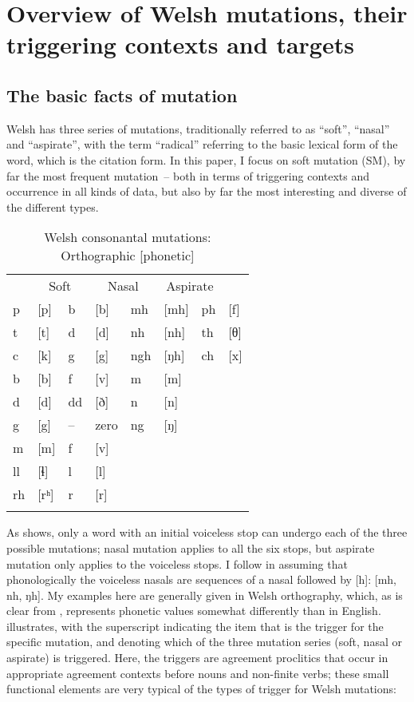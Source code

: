 \documentclass[output=paper,colorlinks,citecolor=brown]{langscibook}
\begin{document}
\section{Overview of Welsh mutations, their triggering contexts and targets}\label{sec:tallerman:2}
\subsection{The basic facts of mutation}

Welsh has three series of mutations, traditionally referred to as “soft”, “nasal” and “aspirate”, with the term “radical” referring to the basic lexical form of the word, which is the citation form. In this paper, I focus on soft mutation (SM), by far the most frequent mutation~– both in terms of triggering contexts and occurrence in all kinds of data, but also by far the most interesting and diverse of the different types. 

\begin{table}
\centering
\caption{Welsh consonantal mutations: Orthographic [phonetic]}
\label{tab:tallerman1}
\begin{tabular}{*8{l}}
\lsptoprule
\multicolumn{2}{c}{{Radical}} & \multicolumn{2}{c}{{Soft}} & \multicolumn{2}{c}{{Nasal}} & \multicolumn{2}{c}{{Aspirate}}\\
\cmidrule(lr){1-2}\cmidrule(lr){3-4}\cmidrule(lr){5-6}\cmidrule(lr){7-8}
p  & [p]  & b  & [b]  & mh  & [mh] & ph & [f]\\
t  & [t]  & d  & [d]  & nh  & [nh] & th & [θ]\\
c  & [k]  & g  & [g]  & ngh & [ŋh] & ch & [x]\\
b  & [b]  & f  & [v]  & m   & [m]  &    & \\
d  & [d]  & dd & [ð]  & n   & [n]  &    & \\
g  & [g]  & –  & zero & ng  & [ŋ]  &    & \\
m  & [m]  & f  & [v]  &     &      &    & \\
ll & [ɬ]  & l  & [l]  &     &      &    & \\
rh & [rʰ] & r  & [r]  &     &      &    & \\
\lspbottomrule
\end{tabular}
\end{table}

As  shows, only a word with an initial voiceless stop can undergo each of the three possible mutations; nasal mutation applies to all the six stops, but aspirate mutation only applies to the voiceless stops. I follow \citet{Hammond2019} in assuming that phonologically the voiceless nasals are sequences of a nasal followed by [h]: [mh, nh, ŋh]. My examples here are generally given in Welsh orthography, which, as is clear from , represents phonetic values somewhat differently than in English.  illustrates, with the superscript indicating the item that is the trigger for the specific mutation, and denoting which of the three mutation series (soft, nasal or aspirate) is triggered. Here, the triggers are agreement proclitics that occur in appropriate agreement contexts before nouns and non-finite verbs; these small functional elements are very typical of the types of trigger for Welsh mutations:
\end{document}
